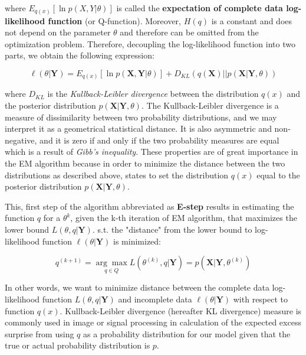 where $E_{q(x)} [\ln p(X,Y|\theta)]$ is called the \textbf{expectation of complete data log-likelihood function} (or Q-function).
Moreover, $H(q)$ is a constant and does not depend on the parameter $\theta$ and therefore can be omitted from the
optimization problem. Therefore, decoupling the log-likelihood function into two parts, we obtain the following expression:

\begin{equation}
    \ell(\theta|\textbf{Y}) = E_{q(x)} [\ln p(\textbf{X},\textbf{Y}|\theta)] + D_{KL} (q(\textbf{X}) || p(\textbf{X}| \textbf{Y},\theta))
\end{equation}

where $D_{KL}$ is the \textit{Kullback-Leibler divergence} between the distribution $q(x)$ and the posterior distribution $p(\textbf{X}|\textbf{Y},\theta)$.
The Kullback-Leibler divergence is a measure of dissimilarity between two probability distributions, and we may interpret it as a geometrical statistical distance.
It is also asymmetric and non-negative, and it is zero if and only if the two probability measures are equal which is a result of \textit{Gibb's inequality}. \citep{Csiszar1975}
These properties are of great importance in the EM algorithm because in order to minimize the distance between the two distributions as described above,
\citep{Bishop2006} states to set the distribution $q(x)$ equal to the posterior distribution $p(\textbf{X}|\textbf{Y},\theta)$.

This, first step of the algorithm abbreviated as \textbf{E-step} results in estimating the function $q$ for a $\theta^{k}$, given the k-th iteration of EM algorithm, 
that maximizes the lower bound $L(\theta,q|\textbf{Y})$. s.t. the "distance" from the lower bound to log-likelihood function $\ell(\theta|\textbf{Y})$ is minimized:

\begin{equation} \label{eq:qnew}
    q^{(k+1)} = \underset{q \in Q}{\arg\max} L(\theta^{(k)},q|\textbf{Y}) = p(\textbf{X}|\textbf{Y},\theta^{(k)})
\end{equation}

In other words, we want to minimize distance between the complete data log-likelihood function $L(\theta,q|\textbf{Y})$ and incomplete data $\ell(\theta|\textbf{Y})$ 
with respect to function $q(x)$. Kullback-Leibler divergence (hereafter KL divergence) measure is commonly used in image or signal processing 
in calculation of the expected excess surprise from using $q$ as a probability distribution for our model given that the true or actual 
probability distribution is $p$. \citep{Balesdent2016} 

